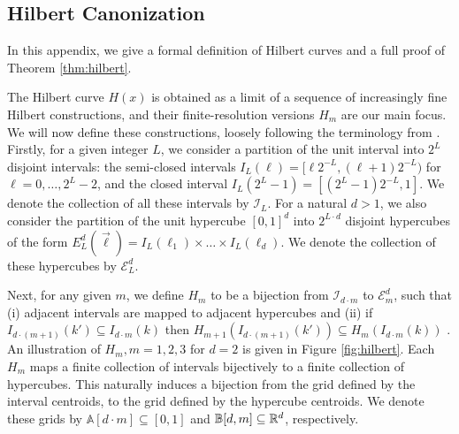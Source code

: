 \documentclass{article}
\begin{document}
\subsection{Hilbert Canonization}\label{app:hilbert}
In this appendix, we give a formal definition of Hilbert curves and a full proof of Theorem \ref {thm:hilbert}.

The Hilbert curve $H(x)$ is obtained as a limit of a sequence of increasingly fine Hilbert constructions, and their finite-resolution versions $H_m$ are our main focus. We will now define these constructions, loosely following the terminology from \cite{Hilbert}. Firstly, for a given integer $L$, we consider a partition of the unit interval into $2^L$ disjoint intervals: the semi-closed intervals $I_L(\ell)=[\ell 2^{-L},(\ell+1)2^{-L})$ for $\ell=0,\ldots,2^{L}-2$, and the closed interval $I_L(2^L-1)=[(2^L-1)2^{-L},1]$. We denote the collection of all these intervals by $\mathcal{I}_L$. For a natural $d>1$, we also consider the partition of the unit hypercube $[0,1]^d$ into $2^{L\cdot d}$ disjoint hypercubes of the form
$E_L^d(\vec{\ell})=I_L(\ell_1)\times \ldots \times I_L(\ell_d)$. We denote the collection of these hypercubes by $\mathcal{E}_L^d$.

Next, for any given $m$, we define  $H_m$ to be a  bijection from $\mathcal{I}_{d\cdot m} $ to $\mathcal{E}_{m}^d $, such that (i) adjacent intervals are mapped to adjacent hypercubes and (ii) if $I_{d\cdot (m+1)}(k')\subseteq I_{d\cdot m}(k) $ then 
$H_{m+1}\left(I_{d\cdot (m+1)}(k')\right)\subseteq H_m\left(I_{d\cdot m}(k) \right) $ . An illustration of $H_m, m=1,2,3$ for $d=2$ is given in Figure \ref{fig:hilbert}. Each $H_m$ maps a finite collection of intervals bijectively to a finite collection of hypercubes. This naturally induces a bijection from the grid defined by the interval centroids, to the grid defined by the hypercube centroids. We denote these grids by $\mathbb{A}[d\cdot m]\subseteq [0,1] $ and $\mathbb{B}[d,m]\subseteq \mathbb{R}^d $, respectively.
\end{document}
